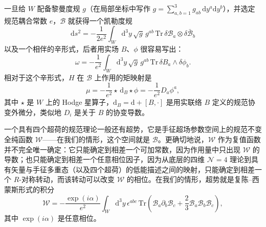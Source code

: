 \documentclass[11pt,a4paper,UTF8]{ctexart}
\theoremstyle{plain}
\theoremstyle{definition}
\begin{document}
一旦给 $W$ 配备黎曼度规 $g$（在局部坐标中写作 $g=\sum_{a,b=1}^{3}g_{ab}\,\mathrm{d}y^a\mathrm{d}y^b$），并选定规范耦合常数 $e$，$\mathcal{B}$ 就获得一个凯勒度规
\begin{equation}
    \mathrm{d}s^2=-\frac{1}{2e^2}\int_W \mathrm{d}^3y\,\sqrt{g}\,g^{ab}\,\mathrm{Tr}\,\delta\mathcal{B}_a\otimes\delta\bar{\mathcal{B}}_b
    \tag{5.34}
\end{equation}
以及一个相伴的辛形式，后者用实场 $B$、$\phi$ 很容易写出：
\begin{equation}
    \omega=-\frac{1}{e^2}\int_W \mathrm{d}^3y\,\sqrt{g}\,g^{ab}\,\mathrm{Tr}\,\delta B_a\wedge\delta\phi_b .
    \tag{5.35}
\end{equation}
相对于这个辛形式，$H$ 在 $\mathcal{B}$ 上作用的矩映射是
\begin{equation}
    \mu=-\frac{1}{e^2}\star\,\mathrm{d}_B\star\phi=-\frac{1}{e^2}D_a\phi^a ,
    \tag{5.36}
\end{equation}
其中 $\star$ 是 $W$ 上的 Hodge 星算子，$\mathrm{d}_B=\mathrm{d}+[B,\cdot]$ 是用实联络 $B$ 定义的规范协变外微分，类似地 $D_i$ 是关于 $B$ 的协变导数。


一个具有四个超荷的规范理论一般还有超势，它是手征超场参数空间上的规范不变全纯函数 $\mathcal{W}$——在我们的情形，这个空间就是 $\mathcal{B}$。更确切地说，$\mathcal{W}$ 作为复值函数并不完全唯一确定：它只能确定到相差一个可加常数，因为作用量中只出现 $\mathcal{W}$ 的导数；也只能确定到相差一个任意相位因子，因为从底层的四维 $\mathcal{N}=4$ 理论到具有矢量与手征多重态（以及四个超荷）的低能描述之间的映射，只能确定到相差一个 $R$-对称转动，而该转动可以改变 $\mathcal{W}$ 的相位。在我们的情形，超势就是复陈–西蒙斯形式的积分
\begin{equation}
    \mathcal{W}=-\frac{\exp(i\alpha)}{e^2}\int_W \mathrm{d}^3y\,\epsilon^{abc}\,\mathrm{Tr}\left(\mathcal{B}_a\partial_b\mathcal{B}_c+\frac{2}{3}\mathcal{B}_a\mathcal{B}_b\mathcal{B}_c\right),
    \tag{5.37}
\end{equation}
其中 $\exp(i\alpha)$ 是任意相位。
\end{document}
